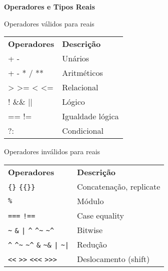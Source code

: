 \documentclass[aspectratio=169,xcolor=dvipsnames]{beamer}
\begin{document}
\begin{frame}
    \Huge{\centerline{\textbf{Operadores e Tipos Reais}}}
\end{frame}

\begin{frame}[fragile]{Operadores válidos para reais}
\begin{tabular}{ll}
\textbf{Operadores} & \textbf{Descrição} \\
+ - & Unários \\
+ - * / ** & Aritméticos \\
> >= < <= & Relacional \\
! \&\& || & Lógico \\
== != & Igualdade lógica \\
?: & Condicional \\
\end{tabular}
\end{frame}

\begin{frame}[fragile]{Operadores inválidos para reais}
\begin{tabular}{ll}
\textbf{Operadores} & \textbf{Descrição} \\
\texttt{\{\}} \texttt{\{\{\}\}} & Concatenação, replicate \\
\texttt{\%} & Módulo \\
\texttt{===} \texttt{!==} & Case equality \\
\texttt{\textasciitilde} \texttt{\&} \texttt{|} \texttt{\textasciicircum} \texttt{\textasciicircum\textasciitilde} \texttt{\textasciitilde\textasciicircum} & Bitwise \\
\texttt{\textasciicircum} \texttt{\textasciicircum\textasciitilde} \texttt{\textasciitilde\textasciicircum} \texttt{\&} \texttt{\textasciitilde\&} \texttt{|} \texttt{\textasciitilde|} & Redução \\
\texttt{<<} \texttt{>>} \texttt{<<<} \texttt{>>>} & Deslocamento (shift) \\
\end{tabular}
\end{frame}

\end{document}
